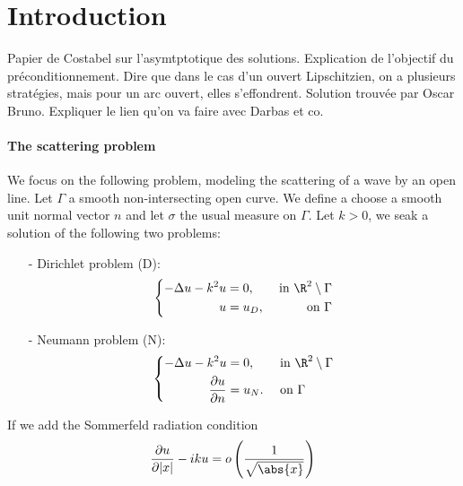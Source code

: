\documentclass[]{article}
\begin{document}
\section{Introduction}


\cite{costabel2003asymptotics} Papier de Costabel sur l'asymtptotique des solutions. 
\cite{yan1990cosine}
Explication de l'objectif du préconditionnement. Dire que dans le cas d'un ouvert Lipschitzien, on a plusieurs stratégies, mais pour un arc ouvert, elles s'effondrent. Solution trouvée par Oscar Bruno. Expliquer le lien qu'on va faire avec Darbas et co. 

\paragraph{The scattering problem}
We focus on the following problem, modeling the scattering of a wave by an open line. Let $\Gamma$ a smooth non-intersecting open curve. We define a choose a smooth unit normal vector $n$ and let $\sigma$ the usual measure on $\Gamma$. Let $k > 0$, we seak a solution of the following two problems:
\begin{itemize}
	\item[-] Dirichlet problem (D):  
	\begin{equation}
	\left \{
	\begin{aligned}
	-\Delta u - k^2 u &= 0, & \text{ in } \R^2 \setminus \Gamma \\
	u &= u_D, & \text{ on } \Gamma \\
	\end{aligned} \right.
	\label{DirichletProblem}
	\end{equation}
	\item[-] Neumann problem (N): 
	\begin{equation}
	\left \{
	\begin{aligned}
	-\Delta u - k^2 u &= 0, && \text{ in } \R^2 \setminus \Gamma \\
	\dfrac{\partial u}{\partial n} &= u_N. && \text{ on } \Gamma 
	\end{aligned} \right.
	\label{NeumannProblem}
	\end{equation} 
\end{itemize}
If we add the Sommerfeld radiation condition
\begin{equation}
\dfrac{\partial u}{\partial |x|} - iku = o\left(\frac{1}{\sqrt{\abs{x}}}\right)
	\label{Sommerfeld}
\end{equation}
\end{document}
